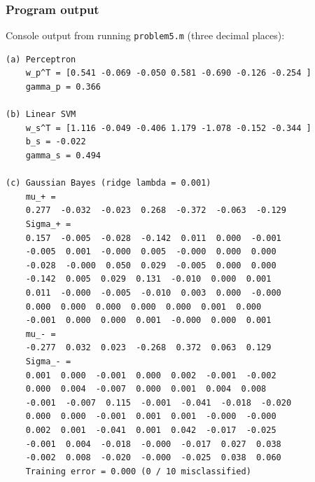 \documentclass[fleqn]{article}
\begin{document}
    \subsubsection*{Program output}
    Console output from running \texttt{problem5.m} (three decimal places):
    \begin{verbatim}
(a) Perceptron
    w_p^T = [0.541 -0.069 -0.050 0.581 -0.690 -0.126 -0.254 ]
    gamma_p = 0.366

(b) Linear SVM 
    w_s^T = [1.116 -0.049 -0.406 1.179 -1.078 -0.152 -0.344 ]
    b_s = -0.022
    gamma_s = 0.494

(c) Gaussian Bayes (ridge lambda = 0.001)
    mu_+ =
    0.277  -0.032  -0.023  0.268  -0.372  -0.063  -0.129  
    Sigma_+ =
    0.157  -0.005  -0.028  -0.142  0.011  0.000  -0.001  
    -0.005  0.001  -0.000  0.005  -0.000  0.000  0.000  
    -0.028  -0.000  0.050  0.029  -0.005  0.000  0.000  
    -0.142  0.005  0.029  0.131  -0.010  0.000  0.001  
    0.011  -0.000  -0.005  -0.010  0.003  0.000  -0.000  
    0.000  0.000  0.000  0.000  0.000  0.001  0.000  
    -0.001  0.000  0.000  0.001  -0.000  0.000  0.001  
    mu_- =
    -0.277  0.032  0.023  -0.268  0.372  0.063  0.129  
    Sigma_- =
    0.001  0.000  -0.001  0.000  0.002  -0.001  -0.002  
    0.000  0.004  -0.007  0.000  0.001  0.004  0.008  
    -0.001  -0.007  0.115  -0.001  -0.041  -0.018  -0.020  
    0.000  0.000  -0.001  0.001  0.001  -0.000  -0.000  
    0.002  0.001  -0.041  0.001  0.042  -0.017  -0.025  
    -0.001  0.004  -0.018  -0.000  -0.017  0.027  0.038  
    -0.002  0.008  -0.020  -0.000  -0.025  0.038  0.060  
    Training error = 0.000 (0 / 10 misclassified)
    \end{verbatim}
\end{document}
